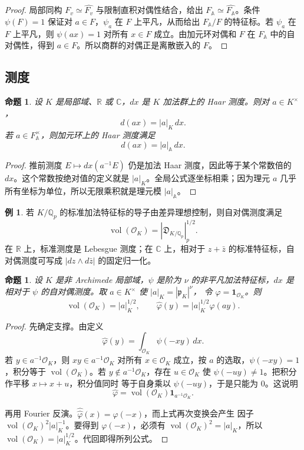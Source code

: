 \documentclass[11pt,a4paper,openany]{ctexbook}
\numberwithin{equation}{chapter}
\newcommand{\Q}{\mathbb{Q}}
\newcommand{\R}{\mathbb{R}}
\newcommand{\C}{\mathbb{C}}
\newcommand{\A}{\mathbb{A}}
\theoremstyle{plain}
\newtheorem{proposition}[theorem]{命题}
\theoremstyle{definition}
\newtheorem{example}[theorem]{例}
\theoremstyle{remark}
\begin{document}
\begin{proof}
局部同构 $F_v\simeq\widehat{F_v}$ 与限制直积对偶性结合，给出 $F_{\A}\simeq\widehat{F_{\A}}$。条件 $\psi(F)=1$ 保证对 $a\in F$，$\psi_a$ 在 $F$ 上平凡，从而给出 $F_{\A}/F$ 的特征标。若 $\psi_a$ 在 $F$ 上平凡，则 $\psi(ax)=1$ 对所有 $x\in F$ 成立。由加元环对偶和 $F$ 在 $F_{\A}$ 中的自对偶性，得到 $a\in F$。所以商群的对偶正是离散嵌入的 $F$。
\end{proof}

\subsection{测度}

\begin{proposition}
设 $K$ 是局部域、$\R$ 或 $\C$，$dx$ 是 $K$ 加法群上的 Haar 测度。则对 $a\in K^\times$，
\[
  d(ax)=|a|_K\,dx.
\]
若 $a\in F_{\A}^{\times}$，则加元环上的 Haar 测度满足
\[
  d(ax)=|a|_{\A}\,dx .
\]
\end{proposition}

\begin{proof}
推前测度 $E\mapsto dx(a^{-1}E)$ 仍是加法 Haar 测度，因此等于某个常数倍的 $dx$。这个常数按绝对值的定义就是 $|a|_K$。全局公式逐坐标相乘；因为理元 $a$ 几乎所有坐标为单位，所以无限乘积就是理元模 $|a|_{\A}$。
\end{proof}

\begin{example}
若 $K/\Q_p$ 的标准加法特征标的导子由差异理想控制，则自对偶测度满足
\[
  \operatorname{vol}(\mathcal O_K)=|\mathfrak D_{K/\Q_p}|_p^{1/2}.
\]
在 $\R$ 上，标准测度是 Lebesgue 测度；在 $\C$ 上，相对于 $z+\bar z$ 的标准特征标，自对偶测度可写成 $|dz\wedge d\bar z|$ 的固定归一化。
\end{example}

\begin{proposition}
设 $K$ 是非 Archimede 局部域，$\psi$ 是阶为 $\nu$ 的非平凡加法特征标，$dx$ 是
相对于 $\psi$ 的自对偶测度。取 $a\in K^\times$ 使 $|a|_K=|\mathfrak p_K|^\nu$，
令 $\varphi=\mathbf 1_{\mathcal O_K}$。则
\[
  \operatorname{vol}(\mathcal O_K)=|a|_K^{1/2},
  \qquad
  \widehat\varphi(y)=|a|_K^{1/2}\varphi(ay).
\]
\end{proposition}

\begin{proof}
先确定支撑。由定义
\[
  \widehat\varphi(y)=\int_{\mathcal O_K}\psi(-xy)\,dx.
\]
若 $y\in a^{-1}\mathcal O_K$，则 $xy\in a^{-1}\mathcal O_K$ 对所有
$x\in\mathcal O_K$ 成立，按 $a$ 的选取，$\psi(-xy)=1$，积分等于
$\operatorname{vol}(\mathcal O_K)$。若 $y\notin a^{-1}\mathcal O_K$，存在
$u\in\mathcal O_K$ 使 $\psi(-uy)\ne1$。把积分作平移 $x\mapsto x+u$，积分值同时
等于自身乘以 $\psi(-uy)$，于是只能为 $0$。这说明
\[
  \widehat\varphi=\operatorname{vol}(\mathcal O_K)\mathbf 1_{a^{-1}\mathcal O_K}.
\]

再用 Fourier 反演。$\widehat{\widehat\varphi}(x)=\varphi(-x)$，而上式再次变换会产生
因子 $\operatorname{vol}(\mathcal O_K)^2 |a|_K^{-1}$。要得到 $\varphi(-x)$，必须有
$\operatorname{vol}(\mathcal O_K)^2=|a|_K$，所以
$\operatorname{vol}(\mathcal O_K)=|a|_K^{1/2}$。代回即得所列公式。
\end{proof}
\end{document}
